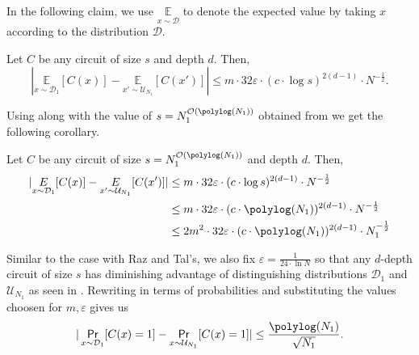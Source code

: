 \documentclass{article}
\begin{document}
In the following claim, we use $\underset{x \sim \mathcal{D}}{\mathbb{E}}$ to denote the expected value by taking $x$ according to the distribution $\mathcal{D}$.

\begin{claim}[{\cite[Claim~8.2]{RT22}}] 
\label{thm:SizeVsAdvantage}
Let $C$ be any circuit of size $s$ and depth $d$. Then,
\begin{equation*}
    |\underset{x \sim \mathcal{D}_1}{\mathbb{E}}[C(x)] - \underset{x' \sim \mathcal{U}_{N_1}}{\mathbb{E}}[C(x')]| \leq m \cdot 32 \varepsilon \cdot (c \cdot \log s)^{2(d-1)} \cdot N^{-\frac{1}{2}}.
\end{equation*}
\end{claim}

Using  along with the value of $s=N_1^{\bigO(\polylog(N_1))}$ obtained from  we get the following corollary.

\begin{corollary}
\label{thm:RPHcircuitSizeAndNoGoTheorem}
Let $C$ be any circuit of size $s=N_1^{\bigO(\polylog(N_1))}$ and depth $d$. Then,
\begin{align*}
\begin{split}
    |\underset{x \sim \mathcal{D}_1}{E}[C(x)] - \underset{x' \sim \mathcal{U}_{N_1}}{E}[C(x')]| & \leq m \cdot 32 \varepsilon \cdot (c \cdot \log s)^{2(d-1)} \cdot N^{-\frac{1}{2}} \\
   & \leq m \cdot 32 \varepsilon \cdot (c \cdot \polylog(N_1))^{2(d-1)} \cdot N^{-\frac{1}{2}} \\
   & \leq 2m^2 \cdot 32 \varepsilon \cdot (c \cdot \polylog(N_1))^{2(d-1)} \cdot N_{1}^{-\frac{1}{2}}
\end{split}
\end{align*} 
\end{corollary}

Similar to the case with Raz and Tal's, we also fix $\varepsilon = \frac{1}{24 \cdot \ln{N}}$ so that any $d$-depth circuit of size $s$ has diminishing advantage of distinguishing distributions $\mathcal{D}_1$ and $\mathcal{U}_{N_1}$ as seen in . Rewriting  in terms of probabilities and substituting the values choosen for $m, \varepsilon$ gives us 
    \begin{equation}
    \label{eq:ClassicalCircDistAdvantage}
        |\probability_{x \sim \mathcal{D}_1} [C(x)=1] - \probability_{x \sim \mathcal{U}_{N_1}} [C(x)=1]| \leq \frac{\polylog(N_1)}{\sqrt{N_1}}.
    \end{equation}
\end{document}
